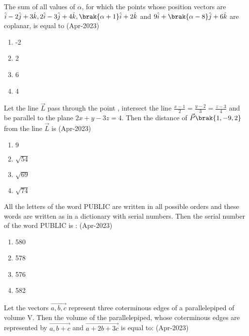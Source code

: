 \iffalse
\title{Assignment}
\author{EE24BTECH11047}
\section{mcq-single}
\fi
 \item The sum of all values of $\alpha$, for which the points whose position vectors are $\hat{i}-2\hat{j}+3\hat{k}, 2\hat{i}-3\hat{j}+4\hat{k}, \brak{\alpha+1}\hat{i}+2\hat{k}$ and $9\hat{i}+\brak{\alpha-8}\hat{j}+6\hat{k}$ are coplanar, is equal to \hfill(Apr-2023)
    \begin{multicols}{4}
    \begin{enumerate}
        \item -2
        \item 2
        \item 6
        \item 4
    \end{enumerate}
    \end{multicols}
\item Let the line $\vec{L}$ pass through the point , intersect the line $\frac{x-1}{2}=\frac{y-2}{3}=\frac{z-3}{4}$ and be parallel to the plane $2x+y-3z=4$. Then the distance of $\vec{P}\brak{1,-9,2}$ from the line $\vec{L}$ is \hfill(Apr-2023)
    \begin{multicols}{4}
    \begin{enumerate}
        \item $9$
        \item $\sqrt{54}$
        \item $\sqrt{69}$
        \item $\sqrt{74}$
    \end{enumerate} 
    \end{multicols}
\item All the letters of the word PUBLIC are written in all possible orders and these words are written as in a dictionary with serial numbers. Then the serial number of the word PUBLIC is : \hfill(Apr-2023)
    \begin{multicols}{4}
    \begin{enumerate}
        \item 580
        \item 578
        \item 576
        \item 582
    \end{enumerate} 
    \end{multicols}
\item Let the vectors $\vec{a,b,c}$ represent three coterminous edges of a parallelepiped of volume V. Then the volume of the parallelepiped, whose coterminous edges are represented by $\vec{a,b+c}$ and $\vec{a+2b+3c}$ is equal to: \hfill(Apr-2023)
